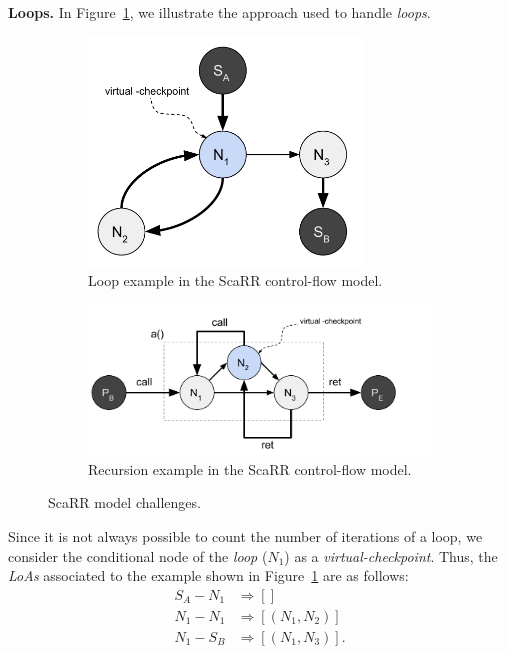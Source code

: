 \textbf{Loops.}
In Figure~\ref{fig:challenge-III}, we illustrate the approach used to handle 
\emph{loops}.
\begin{figure}[t]
	\centering
	\begin{subfigure}[t]{0.4\textwidth}
		\centering
		\includegraphics[width=0.8\textwidth]{fig_c4/challenge-III.pdf}
		\caption{Loop example in the ScaRR control-flow model.}
		\label{fig:challenge-III}
	\end{subfigure}
	\hfill
	\begin{subfigure}[t]{0.5\textwidth}
		\centering
		\includegraphics[width=\textwidth]{fig_c4/challenge-IV.pdf}
		\caption{Recursion example in the ScaRR control-flow model.}
		\label{fig:challenge-IV}
	\end{subfigure}
	\label{fig:challenges}
	\caption{ScaRR model challenges.}
\end{figure}
Since it is not always possible to count the number of iterations of a loop, we 
consider the conditional node of the \emph{loop} (\texttt{$N_1$}) as a 
\emph{virtual-checkpoint}. 
Thus, the \emph{LoAs} associated to the example shown in 
Figure~\ref{fig:challenge-III} are as follows: 
\begin{equation*}
\begin{split}
S_A-N_1 &\Rightarrow [] \\    
N_1-N_1 &\Rightarrow [(N_1, N_2)] \\ 
N_1-S_B &\Rightarrow [(N_1, N_3)].
\end{split}
\end{equation*}

